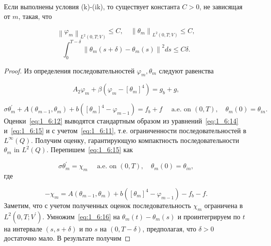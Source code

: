 \begin{lemma}
    \label{lm:1_6:3}
    Если выполнены условия (k)-(ik), то существует константа $C>0$,
    не зависящая от $m$, такая, что

    \begin{equation}
        \label{eq:1_6:12}
        \left\|\varphi_{m}\right\|_{L^{2}(0, T ; V)} \leq C,
        \quad\left\|\theta_{m}\right\|_{L^{2}(0, T ; V)} \leq C,
    \end{equation}
    \begin{equation}
        \label{eq:1_6:13}
        \int_{0}^{T-\delta}\left\|\theta_{m}(s+\delta)
        -\theta_{m}(s)\right\|^{2} d s \leq C \delta.
    \end{equation}
\end{lemma}

\begin{proof}
    Из определения последовательностей $\varphi_{m}, \theta_{m}$ следуют равенства

    \begin{equation}
        \label{eq:1_6:14}
        A_{2} \varphi_{m}+\beta\left(\varphi_{m}-\left[\theta_{m}\right]^{4}\right)=g_{b}+g,
    \end{equation}

    \begin{equation}
        \label{eq:1_6:15}
        \sigma \theta_{m}^{\prime}+A\left(\theta_{m-1}, \theta_{m}\right)
        +b\left(\left[\theta_{m}\right]^{4}-\varphi_{m-1}\right)=f_{b}+f
        \quad \text { a.e. on }(0, T), \quad \theta_{m}(0)=\theta_{i n}.
    \end{equation}
    Оценки~\eqref{eq:1_6:12} выводятся стандартным образом
    из уравнений~\eqref{eq:1_6:14} и~\eqref{eq:1_6:15}
    и с учетом~\eqref{eq:1_6:11},
    т.е. ограниченности последовательностей в $L^{\infty}(Q)$.
    Получим оценку, гарантирующую компактность последовательности $\theta_{m}$ in $L^{2}(Q)$.
    Перепишем~\eqref{eq:1_6:15} как

    \begin{equation}
        \label{eq:1_6:16}
        \sigma \theta_{m}^{\prime}=\chi_{m} \quad \text { a.e. on }(0, T), \quad \theta_{m}(0)=\theta_{in},
    \end{equation}
    где

    \[
        -\chi_{m}=A\left(\theta_{m-1}, \theta_{m}\right)
        +b\left(\left[\theta_{m}\right]^{4}-\varphi_{m-1}\right)-f_{b}-f.
    \]
    Заметим, что с учетом полученных оценок последовательность $\chi_{m}$
    ограничена в $L^{2}\left(0, T ; V^{\prime}\right)$.
    Умножим~\eqref{eq:1_6:16} на $\theta_{m}(t)-\theta_{m}(s)$ и проинтегрируем по $t$
    на интервале $(s, s+\delta)$ и по $s$ на $(0, T-\delta)$,
    предполагая, что $\delta>0$ достаточно мало.
    В результате получим


\end{proof}
